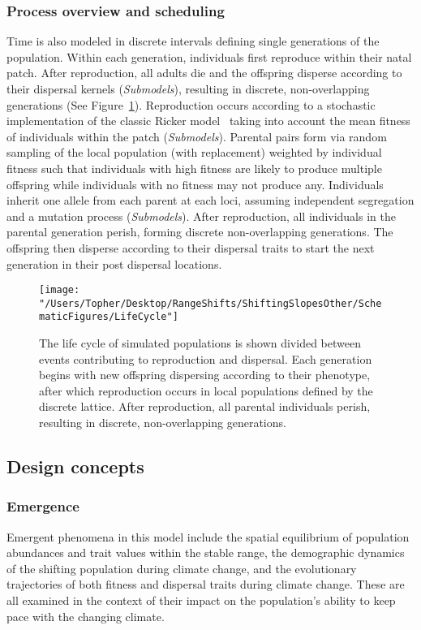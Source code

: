 \documentclass[11pt, oneside]{article}
\begin{document}
\subsubsection{Process overview and scheduling}
Time is also modeled in discrete intervals defining single generations of the population. Within each generation, individuals first reproduce within their natal patch. After reproduction, all adults die and the offspring disperse according to their dispersal kernels (\textit{Submodels}), resulting in discrete, non-overlapping generations (See Figure~\ref{fig:LifeCycle}). Reproduction occurs according to a stochastic implementation of the classic Ricker model~\citep{ricker1954stock} taking into account the mean fitness of individuals within the patch (\textit{Submodels}). Parental pairs form via random sampling of the local population (with replacement) weighted by individual fitness such that individuals with high fitness are likely to produce multiple offspring while individuals with no fitness may not produce any. Individuals inherit one allele from each parent at each loci, assuming independent segregation and a mutation process (\textit{Submodels}). After reproduction, all individuals in the parental generation perish, forming discrete non-overlapping generations. The offspring then disperse according to their dispersal traits to start the next generation in their post dispersal locations.

\begin{figure}
\centering
\texttt{[image: "/Users/Topher/Desktop/RangeShifts/ShiftingSlopesOther/SchematicFigures/LifeCycle"]}
\vspace{-5mm}
\caption[LoF entry]{The life cycle of simulated populations is shown divided between events contributing to reproduction and dispersal. Each generation begins with new offspring dispersing according to their phenotype, after which reproduction occurs in local populations defined by the discrete lattice. After reproduction, all parental individuals perish, resulting in discrete, non-overlapping generations.}
\label{fig:LifeCycle}
\end{figure}


\subsection{Design concepts}
\subsubsection{Emergence}
Emergent phenomena in this model include the spatial equilibrium of population abundances and trait values within the stable range, the demographic dynamics of the shifting population during climate change, and the evolutionary trajectories of both fitness and dispersal traits during climate change. These are all examined in the context of their impact on the population's ability to keep pace with the changing climate.  
\end{document}
